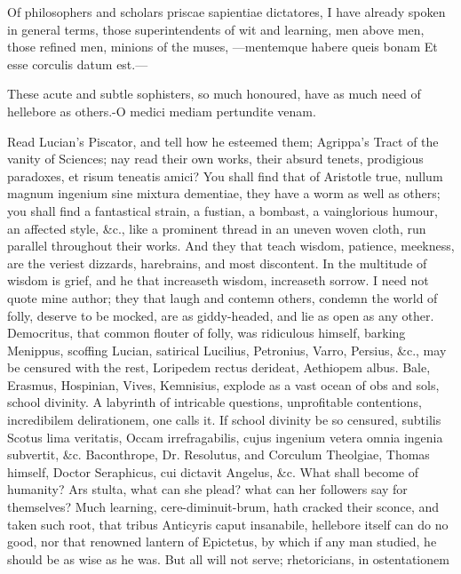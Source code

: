 {Of philosophers and scholars priscae sapientiae dictatores, I have
already spoken in general terms, those superintendents of wit and
learning, men above men, those refined men, minions of the muses,
---mentemque habere queis bonam
Et esse corculis datum est.---

These acute and subtle sophisters, so much honoured, have as much
need of hellebore as others.-O medici mediam pertundite venam.

Read Lucian's Piscator, and tell how he esteemed them; Agrippa's Tract
of the vanity of Sciences; nay read their own works, their absurd
tenets, prodigious paradoxes, et risum teneatis amici? You shall find
that of Aristotle true, nullum magnum ingenium sine mixtura dementiae,
they have a worm as well as others; you shall find a fantastical
strain, a fustian, a bombast, a vainglorious humour, an affected style,
\&c., like a prominent thread in an uneven woven cloth, run parallel
throughout their works. And they that teach wisdom, patience, meekness,
are the veriest dizzards, harebrains, and most discontent. In the
multitude of wisdom is grief, and he that increaseth wisdom, increaseth
sorrow. I need not quote mine author; they that laugh and contemn
others, condemn the world of folly, deserve to be mocked, are as
giddy-headed, and lie as open as any other. Democritus, that
common flouter of folly, was ridiculous himself, barking Menippus,
scoffing Lucian, satirical Lucilius, Petronius, Varro, Persius, \&c.,
may be censured with the rest, Loripedem rectus derideat, Aethiopem
albus. Bale, Erasmus, Hospinian, Vives, Kemnisius, explode as a vast
ocean of obs and sols, school divinity. A labyrinth of intricable
questions, unprofitable contentions, incredibilem delirationem, one
calls it. If school divinity be so censured, subtilis Scotus lima
veritatis, Occam irrefragabilis, cujus ingenium vetera omnia ingenia
subvertit, \&c. Baconthrope, Dr. Resolutus, and Corculum Theolgiae,
Thomas himself, Doctor Seraphicus, cui dictavit Angelus, \&c. What
shall become of humanity? Ars stulta, what can she plead? what can her
followers say for themselves? Much learning,  cere-diminuit-brum,
hath cracked their sconce, and taken such root, that tribus Anticyris
caput insanabile, hellebore itself can do no good, nor that renowned
lantern of Epictetus, by which if any man studied, he should be as
wise as he was. But all will not serve; rhetoricians, in ostentationem
}
